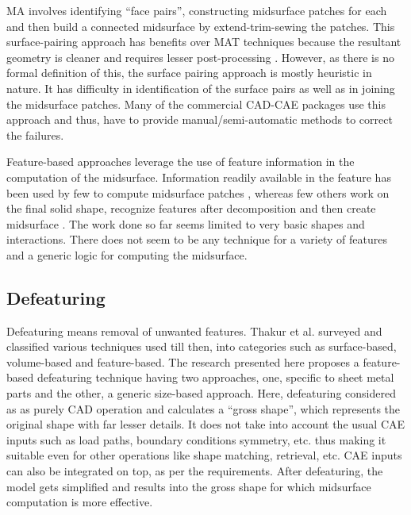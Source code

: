 MA involves identifying ``face pairs'', constructing midsurface patches for each and then build a connected midsurface by extend-trim-sewing the patches. This surface-pairing approach has benefits over MAT techniques because the resultant geometry is cleaner and requires lesser post-processing \cite{Lockett2008}. However, as there is no formal definition of this, the surface pairing approach is mostly heuristic in nature. It has difficulty in identification of the surface pairs as well as in joining the midsurface patches. Many of the commercial CAD-CAE packages use this approach and thus, have to provide manual/semi-automatic methods to correct the failures.

Feature-based approaches leverage the use of feature information in the computation of the midsurface.  Information readily available in the feature has been used by few to compute midsurface patches \cite{Robinson2006, DengBrittonLamTorMa2002}, whereas few others work on the final solid shape, recognize features  after decomposition and then create midsurface \cite{Chong2004, Boussuge2013, Boussuge2013a, Woo2013}. The work done so far seems limited to very basic shapes and interactions. There does not seem to be any technique for a variety of features and a generic logic for computing the midsurface.
 
 \subsection{Defeaturing}
 
Defeaturing means removal of unwanted features.  Thakur et al. \cite{Thakur2009} surveyed and classified various techniques used till then, into categories such as surface-based, volume-based and feature-based.  The research presented  here proposes a feature-based defeaturing technique having two approaches, one, specific to sheet metal parts and the other, a generic size-based approach.  Here, defeaturing considered as as purely CAD operation and  calculates a ``gross shape'', which represents the original shape with far lesser details. It does not take into account the usual CAE inputs such as load paths, boundary conditions symmetry, etc. thus making it suitable even for other operations like shape matching, retrieval, etc. CAE inputs can also be integrated on top, as per the requirements. After defeaturing, the model gets simplified and results into the gross shape for which midsurface computation is more effective.
 
